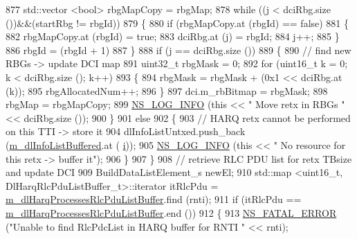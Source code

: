 \begin{DoxyCode}
877               std::vector <bool> rbgMapCopy = rbgMap;
878               \textcolor{keywordflow}{while} ((j < dciRbg.size ())&&(startRbg != rbgId))
879                 \{
880                   \textcolor{keywordflow}{if} (rbgMapCopy.at (rbgId) == \textcolor{keyword}{false})
881                     \{
882                       rbgMapCopy.at (rbgId) = \textcolor{keyword}{true};
883                       dciRbg.at (j) = rbgId;
884                       j++;
885                     \}
886                   rbgId = (rbgId + 1) %
887                 \}
888               \textcolor{keywordflow}{if} (j == dciRbg.size ())
889                 \{
890                   \textcolor{comment}{// find new RBGs -> update DCI map}
891                   uint32\_t rbgMask = 0;
892                   \textcolor{keywordflow}{for} (uint16\_t k = 0; k < dciRbg.size (); k++)
893                     \{
894                       rbgMask = rbgMask + (0x1 << dciRbg.at (k));
895                       rbgAllocatedNum++;
896                     \}
897                   dci.m\_rbBitmap = rbgMask;
898                   rbgMap = rbgMapCopy;
899                   \hyperlink{group__logging_gafbd73ee2cf9f26b319f49086d8e860fb}{NS\_LOG\_INFO} (\textcolor{keyword}{this} << \textcolor{stringliteral}{" Move retx in RBGs "} << dciRbg.size ());
900                 \}
901               \textcolor{keywordflow}{else}
902                 \{
903                   \textcolor{comment}{// HARQ retx cannot be performed on this TTI -> store it}
904                   dlInfoListUntxed.push\_back (\hyperlink{classns3_1_1FdMtFfMacScheduler_ac7f5da1ae0cf374d49f379b07c2c78a7}{m\_dlInfoListBuffered}.at (
      \hyperlink{bernuolliDistribution_8m_a6f6ccfcf58b31cb6412107d9d5281426}{i}));
905                   \hyperlink{group__logging_gafbd73ee2cf9f26b319f49086d8e860fb}{NS\_LOG\_INFO} (\textcolor{keyword}{this} << \textcolor{stringliteral}{" No resource for this retx -> buffer it"});
906                 \}
907             \}
908           \textcolor{comment}{// retrieve RLC PDU list for retx TBsize and update DCI}
909           BuildDataListElement\_s newEl;
910           std::map <uint16\_t, DlHarqRlcPduListBuffer\_t>::iterator itRlcPdu =  
      \hyperlink{classns3_1_1FdMtFfMacScheduler_a156b4cd10f41dd79e446a42c469fee02}{m\_dlHarqProcessesRlcPduListBuffer}.find (rnti);
911           \textcolor{keywordflow}{if} (itRlcPdu == \hyperlink{classns3_1_1FdMtFfMacScheduler_a156b4cd10f41dd79e446a42c469fee02}{m\_dlHarqProcessesRlcPduListBuffer}.end ())
912             \{
913               \hyperlink{group__fatal_ga5131d5e3f75d7d4cbfd706ac456fdc85}{NS\_FATAL\_ERROR} (\textcolor{stringliteral}{"Unable to find RlcPdcList in HARQ buffer for RNTI "} << rnti);

\end{DoxyCode}
